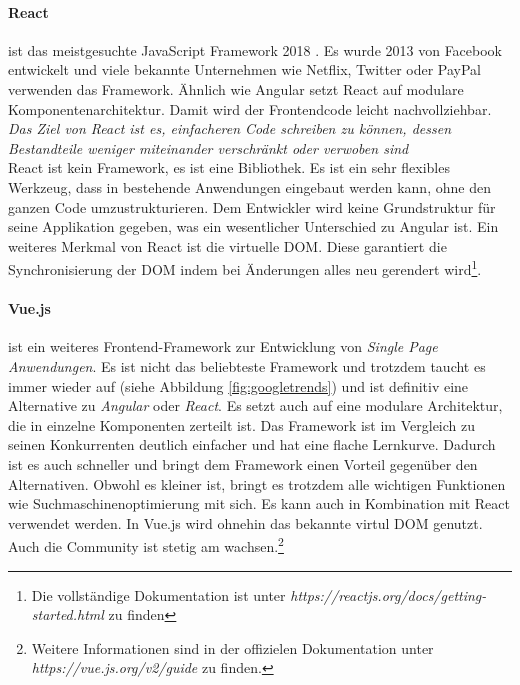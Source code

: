 \paragraph{React}
\label{p:react}
%
ist das meistgesuchte JavaScript Framework 2018 \cite{stackoverflow_stack_2018}. Es wurde 2013 von Facebook entwickelt und viele bekannte Unternehmen wie Netflix, Twitter oder PayPal verwenden das Framework. Ähnlich wie Angular setzt React auf modulare Komponentenarchitektur. Damit wird der Frontendcode leicht nachvollziehbar. \textit{\glqq Das Ziel von React ist es, einfacheren Code schreiben zu können, dessen Bestandteile weniger miteinander verschränkt oder verwoben sind \grqq}\cite{kogel_paul_react_2015} \\
React ist kein Framework, es ist eine Bibliothek. Es ist ein sehr flexibles Werkzeug, dass in bestehende Anwendungen eingebaut werden kann, ohne den ganzen Code umzustrukturieren. Dem Entwickler wird keine Grundstruktur für seine Applikation gegeben, was ein wesentlicher Unterschied zu Angular ist. Ein weiteres Merkmal von React ist die virtuelle DOM. Diese garantiert die Synchronisierung der DOM indem bei Änderungen alles neu gerendert wird\footnote{Die vollständige Dokumentation ist unter \textit{https://reactjs.org/docs/getting-started.html} zu finden}.
%
\paragraph{Vue.js}
\label{p:vueJS}
%
ist ein weiteres Frontend-Framework zur Entwicklung von \textit{Single Page Anwendungen}. Es ist nicht das beliebteste Framework und trotzdem taucht es immer wieder auf (siehe Abbildung \ref{fig:googletrends}) und ist definitiv eine Alternative zu \textit{Angular} oder \textit{React}. Es setzt auch auf eine modulare Architektur, die in einzelne Komponenten zerteilt ist. Das Framework ist im Vergleich zu seinen Konkurrenten deutlich einfacher und hat eine flache Lernkurve. Dadurch ist es auch schneller und bringt dem Framework einen Vorteil gegenüber den Alternativen. Obwohl es kleiner ist, bringt es trotzdem alle wichtigen Funktionen wie Suchmaschinenoptimierung mit sich. Es kann auch in Kombination mit React verwendet werden. In Vue.js wird ohnehin das bekannte virtul DOM genutzt. Auch die Community ist stetig am wachsen.\footnote{Weitere Informationen sind in der offizielen Dokumentation unter \emph{https://vue.js.org/v2/guide} zu finden.} \\
%
%
%
%
%
%
